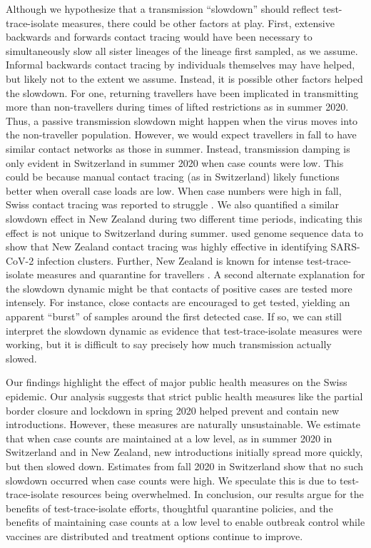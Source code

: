 \documentclass[11pt,twoside,lineno]{pnas-new} %
\begin{document}
Although we hypothesize that a transmission ``slowdown'' should reflect test-trace-isolate measures, there could be other factors at play. First, extensive backwards and forwards contact tracing would have been necessary to simultaneously slow all sister lineages of the lineage first sampled, as we assume. Informal backwards contact tracing by individuals themselves may have helped, but likely not to the extent we assume. Instead, it is possible other factors helped the slowdown. For one, returning travellers have been implicated in transmitting more than non-travellers \cite{Hodcroft2021} during times of lifted restrictions as in summer 2020. Thus, a passive transmission slowdown might happen when the virus moves into the non-traveller population. However, we would expect travellers in fall to have similar contact networks as those in summer. Instead, transmission damping is only evident in Switzerland in summer 2020 when case counts were low. This could be because manual contact tracing (as in Switzerland) likely functions better when overall case loads are low. When case numbers were high in fall, Swiss contact tracing was reported to struggle \cite{SWI-contact-tracing-failing}. We also quantified a similar slowdown effect in New Zealand during two different time periods, indicating this effect is not unique to Switzerland during summer. \cite{Mendes2021} used genome sequence data to show that New Zealand contact tracing was highly effective in identifying SARS-CoV-2 infection clusters. Further, New Zealand is known for intense test-trace-isolate measures and quarantine for travellers \cite{ZL-covid-policies}. A second alternate explanation for the slowdown dynamic might be that contacts of positive cases are tested more intensely. For instance, close contacts are encouraged to get tested, yielding an apparent ``burst'' of samples around the first detected case. If so, we can still interpret the slowdown dynamic as evidence that test-trace-isolate measures were working, but it is difficult to say precisely how much transmission actually slowed.

Our findings highlight the effect of major public health measures on the Swiss epidemic. Our analysis suggests that strict public health measures like the partial border closure and lockdown in spring 2020 helped prevent and contain new introductions. However, these measures are naturally unsustainable. We estimate that when case counts are maintained at a low level, as in summer 2020 in Switzerland and in New Zealand, new introductions initially spread more quickly, but then slowed down. Estimates from fall 2020 in Switzerland show that no such slowdown occurred when case counts were high. We speculate this is due to test-trace-isolate resources being overwhelmed. In conclusion, our results argue for the benefits of test-trace-isolate efforts, thoughtful quarantine policies, and the benefits of maintaining case counts at a low level to enable outbreak control while vaccines are distributed and treatment options continue to improve.
\end{document}
